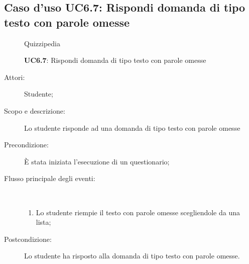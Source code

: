 \subsection{Caso d'uso UC6.7: Rispondi domanda di tipo testo con parole omesse}
	\begin{figure}[H]
		\centering
		\begin{resizedtikzpicture}{\textwidth}
		\begin{umlsystem}[x=0, fill=lightgray!20]{Quizzipedia}
		\end{umlsystem}
		\end{resizedtikzpicture}
		\caption{\textbf{UC6.7}: Rispondi domanda di tipo testo con parole omesse}
		\label{UC6.7}
	\end{figure}
\begin{description}
\item[Attori:] Studente;
\item[Scopo e descrizione:] Lo studente risponde ad una domanda di tipo testo con parole omesse
      \item[Precondizione:] È stata iniziata l'esecuzione di un questionario;

        \item[Flusso principale degli eventi:] \ 
 \begin{enumerate}
          \item Lo studente riempie il testo con parole omesse scegliendole da una lista;

      \end{enumerate}
    \item[Postcondizione:] Lo studente ha risposto alla domanda di tipo testo con parole omesse.
  \end{description}
\hypertarget{UC6.8}{}
